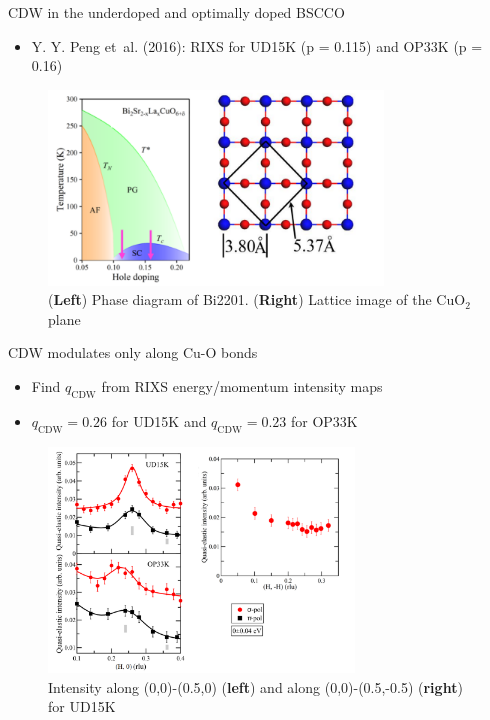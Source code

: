 \documentclass{beamer}
\begin{document}
\begin{frame}{CDW in the underdoped and optimally doped BSCCO}
\begin{itemize}
\item Y. Y. Peng et~al. (2016): RIXS for UD15K (p = 0.115) and OP33K (p = 0.16)
\end{itemize}
\begin{figure}
\includegraphics[width=3.5in]{figs/1a_lattice.png}
\caption*{(\textbf{Left}) Phase diagram of Bi2201. (\textbf{Right}) Lattice image of the CuO$_2$ plane}
\end{figure}
\end{frame}

\begin{frame}{CDW modulates only along Cu-O bonds}
\begin{itemize}
\item Find $q_\text{CDW}$ from RIXS energy/momentum intensity maps
\item $q_\text{CDW} = 0.26$ for UD15K and $q_\text{CDW} = 0.23$ for OP33K
\end{itemize}
\begin{figure}
\includegraphics[width=3.2in]{figs/2ab_4a.png}
\caption*{Intensity along (0,0)-(0.5,0) (\textbf{left}) and along (0,0)-(0.5,-0.5) (\textbf{right}) for UD15K}
\end{figure}
\end{frame}
\end{document}
